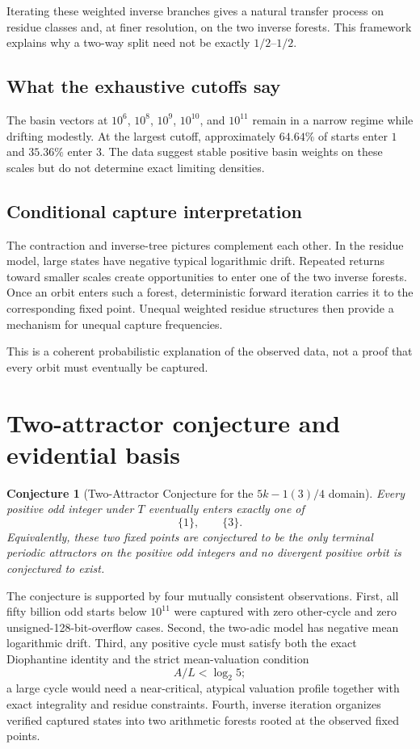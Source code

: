\documentclass[11pt]{article}
\newtheorem{conjecture}{Conjecture}
\begin{document}
Iterating these weighted inverse branches gives a natural transfer process on residue classes and, at finer resolution, on the two inverse forests. This framework explains why a two-way split need not be exactly $1/2$--$1/2$.

\subsection{What the exhaustive cutoffs say}

The basin vectors at $10^6$, $10^8$, $10^9$, $10^{10}$, and $10^{11}$ remain in a narrow regime while drifting modestly. At the largest cutoff, approximately $64.64\%$ of starts enter $1$ and $35.36\%$ enter $3$. The data suggest stable positive basin weights on these scales but do not determine exact limiting densities.

\subsection{Conditional capture interpretation}

The contraction and inverse-tree pictures complement each other. In the residue model, large states have negative typical logarithmic drift. Repeated returns toward smaller scales create opportunities to enter one of the two inverse forests. Once an orbit enters such a forest, deterministic forward iteration carries it to the corresponding fixed point. Unequal weighted residue structures then provide a mechanism for unequal capture frequencies.

This is a coherent probabilistic explanation of the observed data, not a proof that every orbit must eventually be captured.

\section{Two-attractor conjecture and evidential basis}

\begin{conjecture}[Two-Attractor Conjecture for the $5k-1(3)/4$ domain]
Every positive odd integer under $T$ eventually enters exactly one of
\[
\{1\},\qquad\{3\}.
\]
Equivalently, these two fixed points are conjectured to be the only terminal periodic attractors on the positive odd integers and no divergent positive orbit is conjectured to exist.
\end{conjecture}

The conjecture is supported by four mutually consistent observations. First, all fifty billion odd starts below $10^{11}$ were captured with zero other-cycle and zero unsigned-128-bit-overflow cases. Second, the two-adic model has negative mean logarithmic drift. Third, any positive cycle must satisfy both the exact Diophantine identity and the strict mean-valuation condition
\[
A/L<\log_2 5;
\]
a large cycle would need a near-critical, atypical valuation profile together with exact integrality and residue constraints. Fourth, inverse iteration organizes verified captured states into two arithmetic forests rooted at the observed fixed points.
\end{document}
